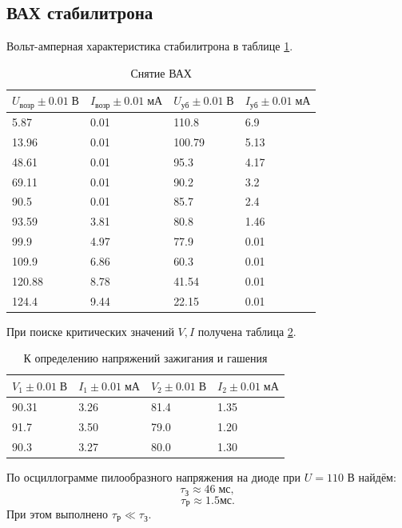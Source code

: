 \documentclass[a4paper]{article}
\begin{document}
\subsection{ВАХ стабилитрона}

Вольт-амперная характеристика стабилитрона в таблице \ref{tab:VAH}.
\begin{table}[h]
	\centering
	\begin{tabular}{|l|l||l|l|}
		\hline
		$U_{возр}\pm 0.01\; В$ & $I_{возр}\pm 0.01\; мА$ & $U_{уб}\pm 0.01\; В$ & $I_{уб}\pm 0.01\; мА$ \\ \hline
		5.87   & 0.01 & 110.8  & 6.9  \\ \hline
		13.96  & 0.01 & 100.79 & 5.13 \\ \hline
		48.61  & 0.01 & 95.3   & 4.17 \\ \hline
		69.11  & 0.01 & 90.2   & 3.2  \\ \hline
		90.5   & 0.01 & 85.7   & 2.4  \\ \hline
		93.59  & 3.81 & 80.8   & 1.46 \\ \hline
		99.9   & 4.97 & 77.9   & 0.01 \\ \hline
		109.9  & 6.86 & 60.3   & 0.01 \\ \hline
		120.88 & 8.78 & 41.54  & 0.01 \\ \hline
		124.4  & 9.44 & 22.15  & 0.01 \\ \hline
	\end{tabular}
	\caption{Снятие ВАХ}
	\label{tab:VAH}
\end{table}

При поиске критических значений $ V, I $ получена таблица \ref{tab:зажигание}.
\begin{table}[h]
	\centering
	\begin{tabular}{|l|l|l|l|}
		\hline
		$V_1 \pm 0.01 \;В$ & $I_1 \pm 0.01 \;мА$ & $V_2 \pm 0.01 \;В$ & $I_2 \pm 0.01 \;мА$ \\ \hline
		90.31              & 3.26                & 81.4               & 1.35                \\ \hline
		91.7               & 3.50                & 79.0               & 1.20                \\ \hline
		90.3               & 3.27                & 80.0               & 1.30                \\ \hline
	\end{tabular}
	\caption{К определению напряжений зажигания и гашения }
	\label{tab:зажигание}
\end{table}

По осциллограмме пилообразного напряжения на диоде при $ U = 110 $ В найдём:
\begin{equation*}\label{key}
	\tau_З \approx 46\; мс,
\end{equation*}
\begin{equation*}\label{key}
	\tau_Р \approx 1.5 мс.
\end{equation*}
При этом выполнено $ \tau_Р\ll \tau_З $.
\end{document}
